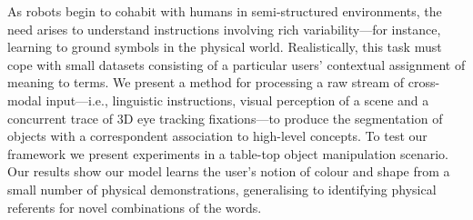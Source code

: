 As robots begin to cohabit with humans in semi-structured environments, the need arises to understand instructions involving rich variability---for instance, learning to ground symbols in the physical world. Realistically, this task must cope with small datasets consisting of a particular users' contextual assignment of meaning to terms. We present a method for processing a raw stream of cross-modal input---i.e., linguistic instructions, visual perception of a scene and a concurrent trace of 3D eye tracking fixations---to produce the segmentation of objects with a correspondent association to high-level concepts. To test our framework we present experiments in a table-top object manipulation scenario. Our results show our model learns the user's notion of colour and shape from a small number of physical demonstrations, generalising to identifying physical referents for novel combinations of the words.
